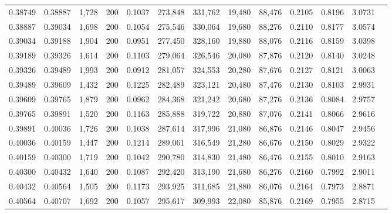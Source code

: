 \begin{tabular}{rrrrrrrrrrrrr}
0.38749 & 0.38887 & 1,728 & 200 &                                     0.1037 & 273,848 & 331,762 &  19,480 &  88,476 & 0.2105 & 0.8196 & 3.0731 \\
0.38887 & 0.39034 & 1,698 & 200 &                                     0.1054 & 275,546 & 330,064 &  19,680 &  88,276 & 0.2110 & 0.8177 & 3.0574 \\
0.39034 & 0.39188 & 1,904 & 200 &                                     0.0951 & 277,450 & 328,160 &  19,880 &  88,076 & 0.2116 & 0.8159 & 3.0398 \\
0.39189 & 0.39326 & 1,614 & 200 &                                     0.1103 & 279,064 & 326,546 &  20,080 &  87,876 & 0.2120 & 0.8140 & 3.0248 \\
0.39326 & 0.39489 & 1,993 & 200 &                                     0.0912 & 281,057 & 324,553 &  20,280 &  87,676 & 0.2127 & 0.8121 & 3.0063 \\
0.39489 & 0.39609 & 1,432 & 200 &                                     0.1225 & 282,489 & 323,121 &  20,480 &  87,476 & 0.2130 & 0.8103 & 2.9931 \\
0.39609 & 0.39765 & 1,879 & 200 &                                     0.0962 & 284,368 & 321,242 &  20,680 &  87,276 & 0.2136 & 0.8084 & 2.9757 \\
0.39765 & 0.39891 & 1,520 & 200 &                                     0.1163 & 285,888 & 319,722 &  20,880 &  87,076 & 0.2141 & 0.8066 & 2.9616 \\
0.39891 & 0.40036 & 1,726 & 200 &                                     0.1038 & 287,614 & 317,996 &  21,080 &  86,876 & 0.2146 & 0.8047 & 2.9456 \\
0.40036 & 0.40159 & 1,447 & 200 &                                     0.1214 & 289,061 & 316,549 &  21,280 &  86,676 & 0.2150 & 0.8029 & 2.9322 \\
0.40159 & 0.40300 & 1,719 & 200 &                                     0.1042 & 290,780 & 314,830 &  21,480 &  86,476 & 0.2155 & 0.8010 & 2.9163 \\
0.40300 & 0.40432 & 1,640 & 200 &                                     0.1087 & 292,420 & 313,190 &  21,680 &  86,276 & 0.2160 & 0.7992 & 2.9011 \\
0.40432 & 0.40564 & 1,505 & 200 &                                     0.1173 & 293,925 & 311,685 &  21,880 &  86,076 & 0.2164 & 0.7973 & 2.8871 \\
0.40564 & 0.40707 & 1,692 & 200 &                                     0.1057 & 295,617 & 309,993 &  22,080 &  85,876 & 0.2169 & 0.7955 & 2.8715 \\

\end{tabular}
